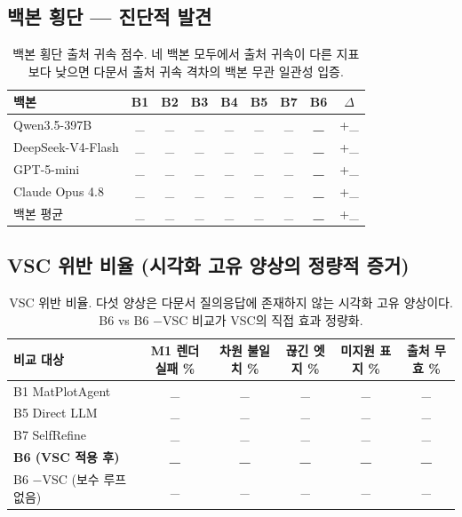 \documentclass[11pt]{article}
\begin{document}
\subsection{백본 횡단 — 진단적 발견}

\begin{table}[h]
\centering
\small
\begin{tabular}{l|ccccccc|c}
\toprule
백본 & B1 & B2 & B3 & B4 & B5 & B7 & \textbf{B6} & $\Delta$ \\
\midrule
Qwen3.5-397B & \_ & \_ & \_ & \_ & \_ & \_ & \textbf{\_} & +\_ \\
DeepSeek-V4-Flash & \_ & \_ & \_ & \_ & \_ & \_ & \textbf{\_} & +\_ \\
GPT-5-mini & \_ & \_ & \_ & \_ & \_ & \_ & \textbf{\_} & +\_ \\
Claude Opus 4.8 & \_ & \_ & \_ & \_ & \_ & \_ & \textbf{\_} & +\_ \\
\midrule
백본 평균 & \_ & \_ & \_ & \_ & \_ & \_ & \textbf{\_} & +\_ \\
\bottomrule
\end{tabular}
\caption{백본 횡단 출처 귀속 점수. 네 백본 모두에서 출처 귀속이 다른 지표보다 낮으면 다문서 출처 귀속 격차의 백본 무관 일관성 입증.}
\label{tab:t4}
\end{table}

\subsection{VSC 위반 비율 (시각화 고유 양상의 정량적 증거)}

\begin{table}[h]
\centering
\small
\begin{tabular}{l|ccccc}
\toprule
비교 대상 & M1 렌더 실패 \% & 차원 불일치 \% & 끊긴 엣지 \% & 미지원 표지 \% & 출처 무효 \% \\
\midrule
B1 MatPlotAgent & \_ & \_ & \_ & \_ & \_ \\
B5 Direct LLM & \_ & \_ & \_ & \_ & \_ \\
B7 SelfRefine & \_ & \_ & \_ & \_ & \_ \\
\textbf{B6 (VSC 적용 후)} & \textbf{\_} & \textbf{\_} & \textbf{\_} & \textbf{\_} & \textbf{\_} \\
B6 −VSC (보수 루프 없음) & \_ & \_ & \_ & \_ & \_ \\
\bottomrule
\end{tabular}
\caption{VSC 위반 비율. 다섯 양상은 다문서 질의응답에 존재하지 않는 시각화 고유 양상이다. B6 vs B6 −VSC 비교가 VSC의 직접 효과 정량화.}
\label{tab:vsc}
\end{table}
\end{document}
